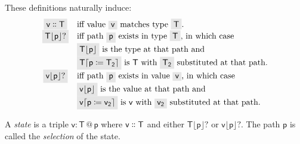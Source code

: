 \documentclass[english,submission]{programming}
\makeatletter
\newcommand{\mathbox}[1]{\colorbox{black!10}{$#1$}}
\DeclareMathOperator{\at}{\textsf{@}}
\makeatother
\begin{document}
These definitions naturally induce:
\[ \begin{array}{cl}
  \mathbox{\textsf{v} \dblcolon \textsf{T}} & \textrm{iff value \mathbox{\textsf{v}} matches type \mathbox{\textsf{T}}}.\\

  \mathbox{\textsf{T}\lfloor\textsf{p}\rfloor?} & \textrm{iff path \mathbox{\textsf{p}} exists in type \mathbox{\textsf{T}}} \textrm{, in which case}\\
  & \mathbox{\textsf{T}\lfloor\textsf{p}\rfloor} \textrm{ is the type at that path and }\\
  & \mathbox{\textsf{T}\lceil\textsf{p} \coloneqq \textsf{T}_\textsf{2}\rceil} \textrm{ is \textsf{T} with } \mathbox{\textsf{T}_\textsf{2}} \textrm{ substituted at that path.}\\

  \mathbox{\textsf{v}\lfloor\textsf{p}\rfloor?} &\textrm{iff path \mathbox{\textsf{p}} exists in value \mathbox{\textsf{v}}} \textrm{, in which case }\\
  & \mathbox{\textsf{v}\lfloor\textsf{p}\rfloor} \textrm{ is the value at that path and}\\
  & \mathbox{\textsf{v}\lceil\textsf{p} \coloneqq \textsf{v}_\textsf{2}\rceil} \textrm{ is \textsf{v} with } \mathbox{\textsf{v}_\textsf{2}} \textrm{ substituted at that path.}\\
\end{array}\]

A \textit{state} is a triple \mathbox{\textsf{v} : \textsf{T} \at \textsf{p}} where \mathbox{\textsf{v} \dblcolon \textsf{T}} and either \mathbox{\textsf{T}\lfloor\textsf{p}\rfloor?} or \mathbox{\textsf{v}\lfloor\textsf{p}\rfloor?}. The path \mathbox{\textsf{p}} is called the \textit{selection} of the state.


\printbibliography
\end{document}

